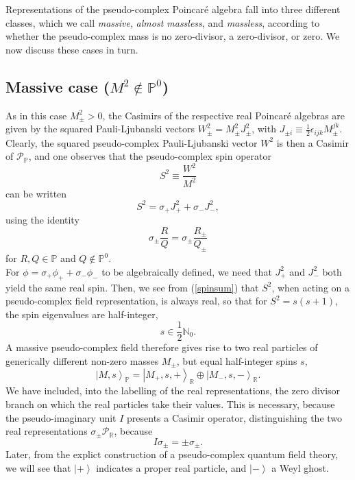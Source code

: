 \documentclass[a4paper,aps,prd,showkeys,showpacs,superscriptaddress,preprint]{revtex4}
\newcommand{\pc}{\mathbb{P}}
\newcommand{\reals}{\mathbb{R}}
\begin{document}
Representations of the pseudo-complex Poincar\'e algebra fall into
three different classes, which we call \textsl{massive},
\textsl{almost massless}, and \textsl{massless}, according to whether
the pseudo-complex mass is no zero-divisor, a zero-divisor, or zero. We now discuss these cases in turn.

\subsection{Massive case ($M^2 \not\in\pc^0$)}
As in this case $M_\pm^2 >0$, the Casimirs of the respective real Poincar\'e algebras
are given by the squared Pauli-Ljubanski vectors $W_\pm^2 = M_\pm^2
J_\pm^2$, with $J_{\pm i} \equiv \frac{1}{2} \epsilon_{ijk} M_\pm^{jk}$. Clearly,
the squared pseudo-complex Pauli-Ljubanski vector $W^2$ is then a
Casimir of $\mathcal{P}_\pc$, and one observes that the pseudo-complex
spin operator
\begin{equation}
  S^2 \equiv \frac{W^2}{M^2}
\end{equation}
can be written
\begin{equation}\label{spinsum}
  S^2 = \sigma_+ J_+^2 + \sigma_- J_-^2,
\end{equation}
using the identity
\begin{equation}\label{sigmaquotient}
\sigma_\pm \frac{R}{Q} = \sigma_\pm \frac{R_\pm}{Q_\pm}
\end{equation}
for $R,Q \in\pc$ and $Q\not\in\pc^0$.\\
For $\phi = \sigma_+ \phi_+ + \sigma_- \phi_-$ to be algebraically
defined, we need that $J_+^2$ and $J_-^2$ both yield the same real
spin. Then, we see from (\ref{spinsum}) that $S^2$, when acting on a pseudo-complex field
representation, is always real, so that for $S^2 = s(s+1)$, the spin
eigenvalues are half-integer,
\begin{equation}
  s \in \frac{1}{2}\mathbb{N}_0.
\end{equation}
A massive pseudo-complex field therefore gives rise to two real
particles of generically different non-zero masses $M_\pm$, but equal
half-integer spins $s$,
\begin{equation}
  \left|M, s\right>_\pc = \left|M_+, s, +\right>_\reals \oplus \left|M_-, s, -\right>_\reals.
\end{equation}
We have included, into the labelling of the real representations,
the zero divisor branch on which the real particles take their
values. This is necessary, because the pseudo-imaginary unit $I$ presents a
Casimir operator, distinguishing the two real representations
$\sigma_\pm \mathcal{P}_\reals$, because
\begin{equation}
  I \sigma_\pm = \pm \sigma_\pm.
\end{equation}
Later, from the explict construction of a pseudo-complex quantum field
theory, we will see that $\left|+\right>$ indicates a proper real particle, and $\left|-\right>$ a
Weyl ghost. 
 
\end{document}
